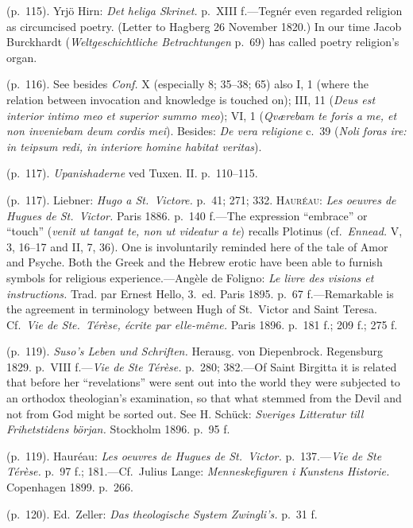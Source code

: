 \documentclass[12pt,a4paper]{book}
\begin{document}
 (p.~115). Yrjö Hirn: \emph{Det heliga Skrinet.} p.~XIII f.---Tegnér even regarded religion as
circumcised poetry. (Letter to Hagberg 26 November 1820.) In our time Jacob Burckhardt
(\emph{Weltgeschichtliche Betrachtungen} p.~69) has called poetry religion's organ.

 (p.~116). See besides \emph{Conf.} X (especially 8; 35--38; 65) also I, 1 (where the relation between
invocation and knowledge is touched on); III, 11 (\emph{Deus est interior intimo meo et superior
summo meo}); VI, 1 (\emph{Qværebam te foris a me, et non inveniebam deum cordis mei}). Besides:
\emph{De vera religione} c.~39 (\emph{Noli foras ire: in teipsum redi, in interiore homine habitat
veritas}).

 (p.~117). \emph{Upanishaderne} ved Tuxen. II. p.~110--115.

 (p.~117). Liebner: \emph{Hugo a St.\ Victore.} p.~41; 271; 332. \textsc{Hauréau}: \emph{Les oeuvres
de Hugues de St.\ Victor.} Paris 1886. p.~140 f.---The expression ``embrace'' or ``touch''
(\emph{venit ut tangat te, non ut videatur a te}) recalls Plotinus (cf.\ \emph{Ennead.} V, 3, 16--17
and II, 7, 36). One is involuntarily reminded here of the tale of Amor and Psyche. Both the Greek
and the Hebrew erotic have been able to furnish symbols for religious experience.---Angèle de
Foligno: \emph{Le livre des visions et instructions.} Trad. par Ernest Hello, 3.\ ed. Paris 1895.
p.~67 f.---Remarkable is the agreement in terminology between Hugh of St.\ Victor and Saint Teresa.
Cf.\ \emph{Vie de Ste.\ Térèse, écrite par elle-même.} Paris 1896. p.~181 f.; 209 f.; 275 f.

 (p.~119). \emph{Suso's Leben und Schriften.} Herausg. von Diepenbrock. Regensburg 1829. p.~VIII
f.---\emph{Vie de Ste Térèse.} p.~280; 382.---Of Saint Birgitta it is related that before her
``revelations'' were sent out into the world they were subjected to an orthodox theologian's
examination, so that what stemmed from the Devil and not from God might be sorted out. See H. Schück:
\emph{Sveriges Litteratur till Frihetstidens början.} Stockholm 1896. p.~95 f.

 (p.~119). Hauréau: \emph{Les oeuvres de Hugues de St.\ Victor.} p.~137.---\emph{Vie de Ste Térèse.}
p.~97 f.; 181.---Cf.\ Julius Lange: \emph{Menneskefiguren i Kunstens Historie.} Copenhagen 1899.
p.~266.

 (p.~120). Ed.\ Zeller: \emph{Das theologische System Zwingli's.} p.~31 f.
\end{document}

